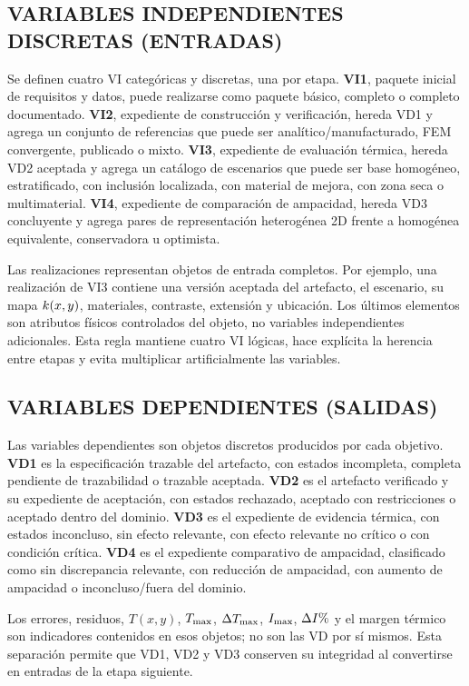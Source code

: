 \subsection{VARIABLES INDEPENDIENTES DISCRETAS (ENTRADAS)}

Se definen cuatro VI categóricas y discretas, una por etapa. \textbf{VI1}, paquete inicial de requisitos y datos, puede realizarse como paquete básico, completo o completo documentado. \textbf{VI2}, expediente de construcción y verificación, hereda VD1 y agrega un conjunto de referencias que puede ser analítico/manufacturado, FEM convergente, publicado o mixto. \textbf{VI3}, expediente de evaluación térmica, hereda VD2 aceptada y agrega un catálogo de escenarios que puede ser base homogéneo, estratificado, con inclusión localizada, con material de mejora, con zona seca o multimaterial. \textbf{VI4}, expediente de comparación de ampacidad, hereda VD3 concluyente y agrega pares de representación heterogénea 2D frente a homogénea equivalente, conservadora u optimista.

Las realizaciones representan objetos de entrada completos. Por ejemplo, una realización de VI3 contiene una versión aceptada del artefacto, el escenario, su mapa $k(x,y)$, materiales, contraste, extensión y ubicación. Los últimos elementos son atributos físicos controlados del objeto, no variables independientes adicionales. Esta regla mantiene cuatro VI lógicas, hace explícita la herencia entre etapas y evita multiplicar artificialmente las variables.

\subsection{VARIABLES DEPENDIENTES (SALIDAS)}

Las variables dependientes son objetos discretos producidos por cada objetivo. \textbf{VD1} es la especificación trazable del artefacto, con estados incompleta, completa pendiente de trazabilidad o trazable aceptada. \textbf{VD2} es el artefacto verificado y su expediente de aceptación, con estados rechazado, aceptado con restricciones o aceptado dentro del dominio. \textbf{VD3} es el expediente de evidencia térmica, con estados inconcluso, sin efecto relevante, con efecto relevante no crítico o con condición crítica. \textbf{VD4} es el expediente comparativo de ampacidad, clasificado como sin discrepancia relevante, con reducción de ampacidad, con aumento de ampacidad o inconcluso/fuera del dominio.

Los errores, residuos, $T(x,y)$, $T_{\max}$, $\Delta T_{\max}$, $I_{\max}$, $\Delta I\pct$ y el margen térmico son indicadores contenidos en esos objetos; no son las VD por sí mismos. Esta separación permite que VD1, VD2 y VD3 conserven su integridad al convertirse en entradas de la etapa siguiente.

